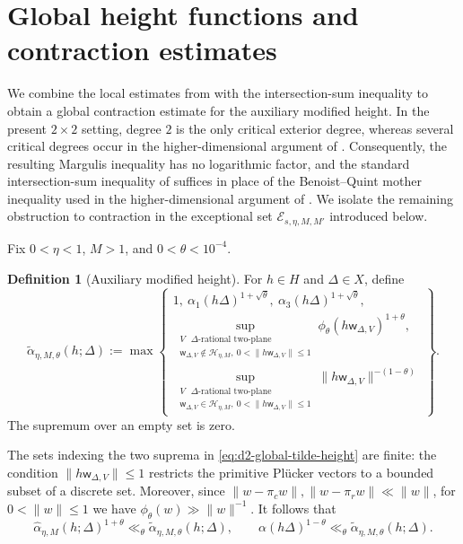 \documentclass[reqno,11pt]{amsart}
\theoremstyle{definition}
\newtheorem{defn}[defn]{Definition}
\theoremstyle{remark}
\numberwithin{equation}{section}
\begin{document}
\section{Global height functions and contraction estimates}
\label{s:globalheight}

We combine the local estimates from
 with the intersection-sum inequality to obtain a
global contraction estimate for the auxiliary modified height. In the
present $2\times2$ setting, degree $2$ is the only critical exterior
degree, whereas several critical degrees occur in the higher-dimensional
argument of \cite{KimOh_det}. Consequently, the resulting Margulis
inequality has no logarithmic factor, and the standard intersection-sum
inequality of \cite{eskin-margulis-mozes:1998} suffices in place of the
Benoist--Quint mother inequality used in the higher-dimensional argument
of \cite{KimOh_det}. We isolate the remaining obstruction to contraction
in the exceptional set $\mathcal E_{s,\eta,M,M'}$ introduced below.


Fix $0<\eta<1$, $M>1$, and $0<\theta<10^{-4}$.

\begin{defn}[Auxiliary modified height]\label{def:auxiliary-height-d2}
For \(h\in H\) and \(\Delta\in X\), define
\begin{equation}\label{eq:d2-global-tilde-height}
\widetilde\alpha_{\eta,M,\theta}(h;\Delta):=\max\left\{
\begin{array}{l}
1,\ \alpha_1(h\Delta)^{1+\sqrt\theta},\ \alpha_3(h\Delta)^{1+\sqrt\theta},\\[1mm]
\displaystyle \sup_{\substack{V\text{ \(\Delta\)-rational two-plane}\\ \mathsf w_{\Delta,V}\notin\mathcal H_{\eta,M},\ 0<\|h\mathsf w_{\Delta,V}\|\le1}}
\phi_\theta(h\mathsf w_{\Delta,V})^{1+\theta},\\[4mm]
\displaystyle \sup_{\substack{V\text{ \(\Delta\)-rational two-plane}\\ \mathsf w_{\Delta,V}\in\mathcal H_{\eta,M},\ 0<\|h\mathsf w_{\Delta,V}\|\le1}}
\|h\mathsf w_{\Delta,V}\|^{-(1-\theta)}
\end{array}\right\}.
\end{equation}
The supremum over an empty set is zero.
\end{defn}


The sets indexing the two suprema in
\eqref{eq:d2-global-tilde-height} are finite: the condition
$\|h\mathsf w_{\Delta,V}\|\le1$ restricts the primitive Pl\"ucker vectors
to a bounded subset of a discrete set. Moreover, since
$\|w-\pi_cw\|,\|w-\pi_rw\|\ll\|w\|$, for $0<\|w\|\le1$ we have
$\phi_\theta(w)\gg\|w\|^{-1}$. It follows that
\begin{equation}\label{eq:auxiliary-comparisons}
\widehat\alpha_{\eta,M}(h;\Delta)^{1+\theta}
\ll_\theta
\widetilde\alpha_{\eta,M,\theta}(h;\Delta),
\qquad
\alpha(h\Delta)^{1-\theta}
\ll_\theta
\widetilde\alpha_{\eta,M,\theta}(h;\Delta).
\end{equation}
\end{document}
